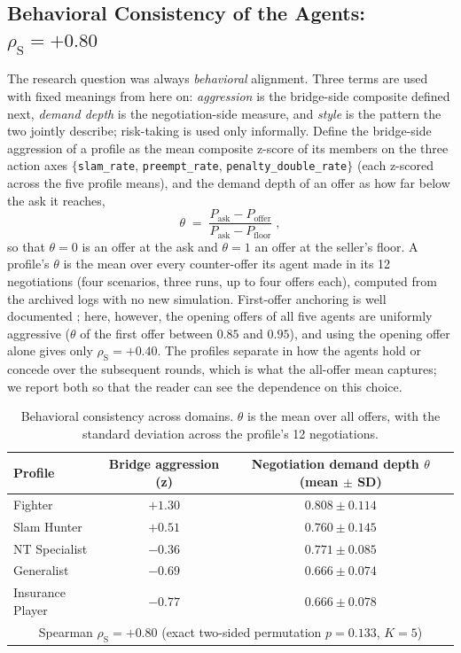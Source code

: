 \documentclass[11pt,a4paper]{article}
\newcommand{\rhoS}{\rho_{\mathrm{S}}}
\begin{document}
\subsection{Behavioral Consistency of the Agents: $\rhoS = +0.80$}\label{sec:style}

The research question was always \emph{behavioral} alignment. Three
terms are used with fixed meanings from here on: \emph{aggression} is
the bridge-side composite defined next, \emph{demand depth} is the
negotiation-side measure, and \emph{style} is the pattern the two
jointly describe; risk-taking is used only informally. Define the
bridge-side aggression of a profile as the mean composite z-score of
its members on the three action axes $\{$\texttt{slam\_rate},
\texttt{preempt\_rate}, \texttt{penalty\_double\_rate}$\}$ (each
z-scored across the five profile means), and the demand depth of an
offer as how far below the ask it reaches,
\begin{equation}
\theta \;=\; \frac{P_{\mathrm{ask}} - P_{\mathrm{offer}}}
{P_{\mathrm{ask}} - P_{\mathrm{floor}}}\;,
\label{eq:theta}
\end{equation}
so that $\theta=0$ is an offer at the ask and $\theta=1$ an offer at the
seller's floor. A profile's $\theta$ is the mean over every
counter-offer its agent made in its 12 negotiations (four scenarios,
three runs, up to four offers each), computed from the archived logs
with no new simulation. First-offer anchoring is well documented
\cite{galinsky2001first}; here, however, the opening offers of all five
agents are uniformly aggressive ($\theta$ of the first offer between
$0.85$ and $0.95$), and using the opening offer alone gives only
$\rhoS=+0.40$. The profiles separate in how the agents hold or concede
over the subsequent rounds, which is what the all-offer mean captures;
we report both so that the reader can see the dependence on this
choice.

\begin{table}[h]
\centering\small
\caption{Behavioral consistency across domains. $\theta$ is the mean
over all offers, with the standard deviation across the profile's 12
negotiations.}
\label{tab:style}
\begin{tabular}{lcc}
\toprule
Profile & Bridge aggression (z) & Negotiation demand depth $\theta$ (mean $\pm$ SD)\\
\midrule
Fighter          & $+1.30$ & $0.808 \pm 0.114$\\
Slam Hunter      & $+0.51$ & $0.760 \pm 0.145$\\
NT Specialist    & $-0.36$ & $0.771 \pm 0.085$\\
Generalist       & $-0.69$ & $0.666 \pm 0.074$\\
Insurance Player & $-0.77$ & $0.666 \pm 0.078$\\
\midrule
\multicolumn{3}{c}{Spearman $\rhoS = \mathbf{+0.80}$ \; (exact two-sided permutation $p=0.133$, $K=5$)}\\
\bottomrule
\end{tabular}
\end{table}
\end{document}
